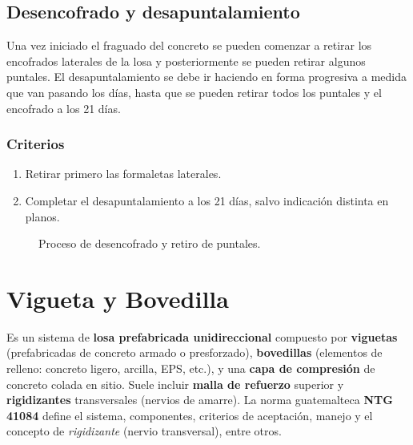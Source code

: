 \documentclass[12pt]{article}
\begin{document}
	\subsection{Desencofrado y desapuntalamiento}
	Una vez iniciado el fraguado del concreto se pueden comenzar a retirar los
	encofrados laterales de la losa y posteriormente se pueden retirar algunos
	puntales. El desapuntalamiento se debe ir haciendo en forma progresiva a medida
	que van pasando los días, hasta que se pueden retirar todos los puntales y el
	encofrado a los 21 días.
	
	\subsubsection{Criterios}
	\begin{enumerate}
		\item Retirar primero las formaletas laterales.
		\item Completar el desapuntalamiento a los 21 días, salvo indicación distinta en planos.
	\end{enumerate}
	
	\begin{figure}[h]
		\centering
		\caption{Proceso de desencofrado y retiro de puntales.}
	\end{figure}
	
	
	
	

	
		
	
	\section{Vigueta y Bovedilla}
	

	Es un sistema de \textbf{losa prefabricada unidireccional} compuesto por \textbf{viguetas} (prefabricadas de concreto armado o presforzado), \textbf{bovedillas} (elementos de relleno: concreto ligero, arcilla, EPS, etc.), y una \textbf{capa de compresión} de concreto colada en sitio. Suele incluir \textbf{malla de refuerzo} superior y \textbf{rigidizantes} transversales (nervios de amarre). La norma guatemalteca \textbf{NTG 41084} define el sistema, componentes, criterios de aceptación, manejo y el concepto de \textit{rigidizante} (nervio transversal), entre otros.
	
\end{document}
